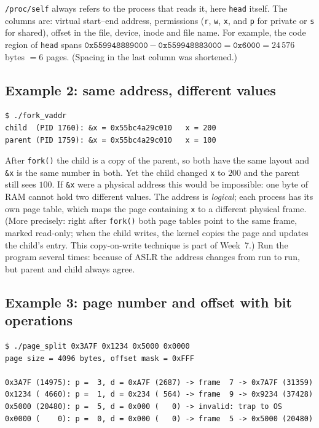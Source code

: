 \documentclass[11pt,a4paper]{article}
\newcommand{\cmd}[1]{\texttt{#1}}
\begin{document}
\texttt{/proc/self} always refers to the process that reads it, here \cmd{head} itself. The columns are: virtual start--end address, permissions (\texttt{r}, \texttt{w}, \texttt{x}, and \texttt{p} for private or \texttt{s} for shared), offset in the file, device, inode and file name. For example, the code region of \cmd{head} spans $\texttt{0x559948889000} - \texttt{0x559948883000} = \texttt{0x6000} = 24\,576$ bytes $= 6$ pages. (Spacing in the last column was shortened.)

\subsection{Example 2: same address, different values}



\begin{lstlisting}[style=term]
$ ./fork_vaddr
child  (PID 1760): &x = 0x55bc4a29c010   x = 200
parent (PID 1759): &x = 0x55bc4a29c010   x = 100
\end{lstlisting}

After \cmd{fork()} the child is a copy of the parent, so both have the same layout and \cmd{\&x} is the same number in both. Yet the child changed \cmd{x} to $200$ and the parent still sees $100$. If \cmd{\&x} were a physical address this would be impossible: one byte of RAM cannot hold two different values. The address is \emph{logical}; each process has its own page table, which maps the page containing \cmd{x} to a different physical frame. (More precisely: right after \cmd{fork()} both page tables point to the same frame, marked read-only; when the child writes, the kernel copies the page and updates the child's entry. This copy-on-write technique is part of Week~7.) Run the program several times: because of ASLR the address changes from run to run, but parent and child always agree.

\subsection{Example 3: page number and offset with bit operations}



\begin{lstlisting}[style=term]
$ ./page_split 0x3A7F 0x1234 0x5000 0x0000
page size = 4096 bytes, offset mask = 0xFFF

0x3A7F (14975): p =  3, d = 0xA7F (2687) -> frame  7 -> 0x7A7F (31359)
0x1234 ( 4660): p =  1, d = 0x234 ( 564) -> frame  9 -> 0x9234 (37428)
0x5000 (20480): p =  5, d = 0x000 (   0) -> invalid: trap to OS
0x0000 (    0): p =  0, d = 0x000 (   0) -> frame  5 -> 0x5000 (20480)
\end{lstlisting}
\end{document}

